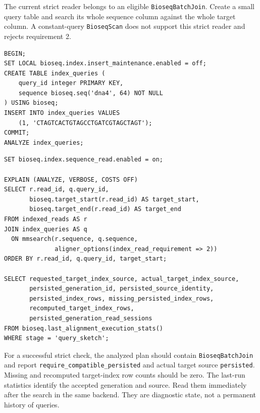 The current strict reader belongs to an eligible \texttt{BioseqBatchJoin}.
Create a small query table and search its whole sequence column against
the whole target column. A constant-query \texttt{BioseqScan} does not
support this strict reader and rejects requirement 2.

\par\noindent\begin{minipage}{\linewidth}
\begin{lstlisting}[style=bioseq-appendix-sql,
  caption={Prepare query rows for the strict batch-join reader.}]
BEGIN;
SET LOCAL bioseq.index.insert_maintenance.enabled = off;
CREATE TABLE index_queries (
    query_id integer PRIMARY KEY,
    sequence bioseq.seq('dna4', 64) NOT NULL
) USING bioseq;
INSERT INTO index_queries VALUES
    (1, 'CTAGTCACTGTAGCCTGATCGTAGCTAGT');
COMMIT;
ANALYZE index_queries;
\end{lstlisting}
\end{minipage}

\par\noindent\begin{minipage}{\linewidth}
\begin{lstlisting}[style=bioseq-appendix-sql,
  caption={Check stored-index use through an analyzed search.}]
SET bioseq.index.sequence_read.enabled = on;

EXPLAIN (ANALYZE, VERBOSE, COSTS OFF)
SELECT r.read_id, q.query_id,
       bioseq.target_start(r.read_id) AS target_start,
       bioseq.target_end(r.read_id) AS target_end
FROM indexed_reads AS r
JOIN index_queries AS q
  ON mmsearch(r.sequence, q.sequence,
              aligner_options(index_read_requirement => 2))
ORDER BY r.read_id, q.query_id, target_start;

SELECT requested_target_index_source, actual_target_index_source,
       persisted_generation_id, persisted_source_identity,
       persisted_index_rows, missing_persisted_index_rows,
       recomputed_target_index_rows,
       persisted_generation_read_sessions
FROM bioseq.last_alignment_execution_stats()
WHERE stage = 'query_sketch';
\end{lstlisting}
\end{minipage}

For a successful strict check, the analyzed plan should contain
\texttt{BioseqBatchJoin} and report
\texttt{require\_compatible\_persisted} and actual target source
\texttt{persisted}. Missing and recomputed target-index row counts should
be zero. The last-run statistics identify the accepted generation and
source. Read them immediately after the search in the same backend.
They are diagnostic state, not a permanent history of queries.

